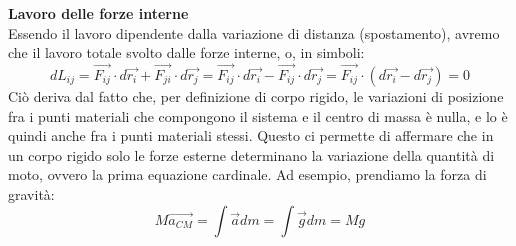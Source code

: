 \documentclass[a4paper,12pt]{article}
\begin{document}
\par\smallskip
\textbf{Lavoro delle forze interne} \\
Essendo il lavoro dipendente dalla variazione di distanza (spostamento), avremo che il lavoro totale svolto dalle forze interne,
o, in simboli:
$$ dL_{ij} = \vec{F_{ij}} \cdot d\vec{r_i} + \vec{F_{ji}} \cdot d\vec{r_j} = \vec{F_{ij}} \cdot d\vec{r_i} - \vec{F_{ij}} \cdot d\vec{r_j} = \vec{F_{ij}} \cdot (d\vec{r_i} - d\vec{r_j}) = 0 $$
Ciò deriva dal fatto che, per definizione di corpo rigido, le variazioni di posizione fra i punti materiali che compongono il sistema e il centro di massa è nulla,
e lo è quindi anche fra i punti materiali stessi.
Questo ci permette di affermare che in un corpo rigido solo le forze esterne determinano la variazione della quantità di moto,
ovvero la prima equazione cardinale. Ad esempio, prendiamo la forza di gravità:
$$ M\vec{a_{CM}} = \int \vec{a} dm = \int \vec{g} dm = Mg $$
\end{document}
